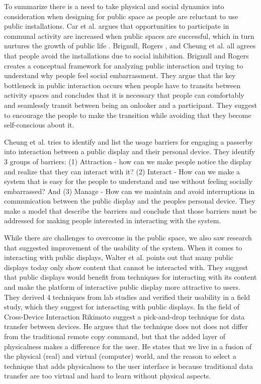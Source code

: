 To summarize there is a need to take physical and social dynamics into consideration when designing for public space as people are reluctant to use public installations. Car et al. argues that opportunities to participate in communal activity are increased when public spaces are successful, which in turn nurtures the growth of public life \protect\cite{carr:1992}. Brignull, Rogers \protect\cite{Brignull:2003}, and Cheung et al. \protect\cite{Cheung:2014} all agrees that people avoid the installations due to social inhibition. Brignull and Rogers creates a conceptual framework for analyzing public interaction and trying to understand why people feel social embarrassment. They argue that the key bottleneck in public interaction occurs when people have to transits between activity spaces and concludes that it is necessary that people can comfortably and seamlessly transit between being an onlooker and a participant. They suggest to encourage the people to make the transition while avoiding that they become self-conscious about it. %

Cheung et al. tries to identify and list the usage barriers for engaging a passerby into interaction between a public display and their personal device. They identify 3 groups of barriers: (1) Attraction - how can we make people notice the display and realize that they can interact with it? (2) Interact - How can we make a system that is easy for the people to understand and use without feeling socially embarrassed? And (3) Manage - How can we maintain and avoid interruptions in communication between the public display and the peoples personal device.
They make a model that describe the barriers and conclude that those barriers must be addressed for making people interested in interacting with the system.

While there are challenges to overcome in the public space, we also saw research that suggested improvement of the usability of the system. When it comes to interacting with public displays, Walter et al. \protect\cite{Walter:2014} points out that many public displays today only show content that cannot be interacted with. They suggest that public displays would benefit from techniques for interacting with its content and make the platform of interactive public display more attractive to users. They derived 4 techniques from lab studies and verified their usability in a field study, which they suggest for interacting with public displays. 
In the field of Cross-Device Interaction Rikimoto \protect\cite{Rekimoto:1997} suggest a pick-and-drop technique for data transfer between devices. He argues that the technique does not does not differ from the traditional remote copy command, but that the added layer of physicalness makes a difference for the user. He states that we live in a fusion of the physical (real) and virtual (computer) world, and the reason to select a technique that adds physicalness to the user interface is because traditional data transfer are too virtual and hard to learn without physical aspects.

